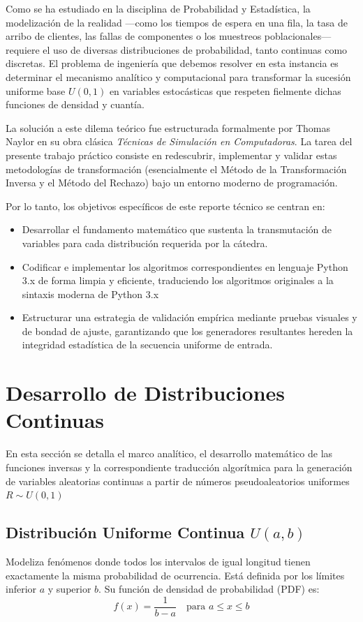 \documentclass{article}
\begin{document}
Como se ha estudiado en la disciplina de Probabilidad y Estadística, la modelización de la realidad —como los tiempos de espera en una fila, la tasa de arribo de clientes, las fallas de componentes o los muestreos poblacionales— requiere el uso de diversas distribuciones de probabilidad, tanto continuas como discretas. El problema de ingeniería que debemos resolver en esta instancia es determinar el mecanismo analítico y computacional para transformar la sucesión uniforme base $U(0,1)$ en variables estocásticas que respeten fielmente dichas funciones de densidad y cuantía.

La solución a este dilema teórico fue estructurada formalmente por Thomas Naylor en su obra clásica \textit{Técnicas de Simulación en Computadoras}. La tarea del presente trabajo práctico consiste en redescubrir, implementar y validar estas metodologías de transformación (esencialmente el Método de la Transformación Inversa y el Método del Rechazo) bajo un entorno moderno de programación.

Por lo tanto, los objetivos específicos de este reporte técnico se centran en:
\begin{itemize}
    \item Desarrollar el fundamento matemático que sustenta la transmutación de variables para cada distribución requerida por la cátedra.
    \item Codificar e implementar los algoritmos correspondientes en lenguaje Python 3.x de forma limpia y eficiente, traduciendo los algoritmos originales a la sintaxis moderna de Python 3.x
    \item Estructurar una estrategia de validación empírica mediante pruebas visuales y de bondad de ajuste, garantizando que los generadores resultantes hereden la integridad estadística de la secuencia uniforme de entrada.
\end{itemize} 

\section{Desarrollo de Distribuciones Continuas}
En esta sección se detalla el marco analítico, el desarrollo matemático de las funciones inversas y la correspondiente traducción algorítmica para la generación de variables aleatorias continuas a partir de números pseudoaleatorios uniformes $R \sim U(0,1)$ 

\subsection{Distribución Uniforme Continua $U(a,b)$}
Modeliza fenómenos donde todos los intervalos de igual longitud tienen exactamente la misma probabilidad de ocurrencia. Está definida por los límites inferior $a$ y superior $b$. Su función de densidad de probabilidad (PDF) es:
\begin{equation}
f(x) = \frac{1}{b-a} \quad \text{para } a \le x \le b
\end{equation}
\end{document}
